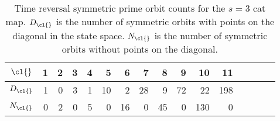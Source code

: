 \begin{description}
\begin{table}
\begin{tabular}{c|rrrrr|rrrrr|rrrrr}
$\cl{}$ &  1 &  2 &  3 &  4 &  5 &
       6 &  7 &  8 &  9 & 10 &
      11 \\%
\hline
$D_\cl{}$ &   1 &   0 &  3 &  1 &  10 &
        2 & 28 & 9 &72 &22&
       198& %
             \rule[-1ex]{0ex}{3.5ex} \\
$N_\cl{}$ &   0 &   2 &   0 &  5 &   0 &
         16 & 0 & 45 & 0 & 130 &
       0 &  %
\end{tabular}
\bigskip
\caption{\label{tab:catMapTimeReversalSymmetric-s=3}
Time reversal symmetric {prime} orbit counts for the ${s}=3$ cat map.
$D_\cl{}$ is the number of symmetric orbits with points on the diagonal in
the state space. $N_\cl{}$ is the number of symmetric orbits without
points on the diagonal.
}
\end{table}


\end{description}
